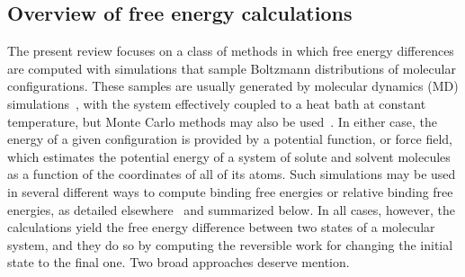 \documentclass[aps,pre,twocolumn,nofootinbib,superscriptaddress,10pt, final,tightenlines]{revtex4-1}
\begin{document}
\subsection{Overview of free energy calculations}
\label{sec:FEMethods}
The present review focuses on a class of methods in which free energy differences are computed with simulations that sample Boltzmann distributions of molecular configurations. 
These samples are usually generated by molecular dynamics (MD) simulations~\cite{karplus_molecular_2002}, with the system effectively coupled to a heat bath at constant temperature, but Monte Carlo methods may also be used~\cite{michel_hit_2008, michel_prediction_2010, cole_molecular_2015}.  
In either case, the energy of a given configuration is provided by a potential function, or force field, which estimates the potential energy of a system of solute and solvent molecules as a function of the coordinates of all of its atoms. 
Such simulations may be used in several different ways to compute binding free energies or relative binding free energies, as detailed elsewhere~\cite{michel_prediction_2010, christ_basic_2010,  chodera_alchemical_2011, shirts_introduction_2013} and summarized below. In all cases, however, the calculations yield the free energy difference between two states of a molecular system, and they do so by computing the reversible work for changing the initial state to the final one. Two broad approaches deserve mention.
\end{document}
